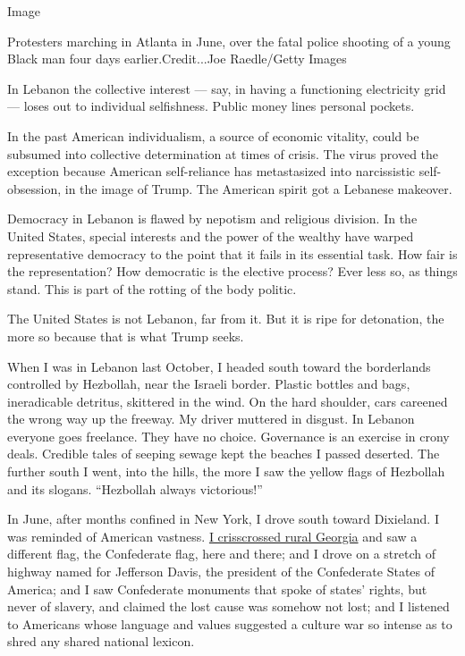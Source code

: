 Image

Protesters marching in Atlanta in June, over the fatal police shooting
of a young Black man four days earlier.Credit...Joe Raedle/Getty Images

In Lebanon the collective interest --- say, in having a functioning
electricity grid --- loses out to individual selfishness. Public money
lines personal pockets.

In the past American individualism, a source of economic vitality, could
be subsumed into collective determination at times of crisis. The virus
proved the exception because American self-reliance has metastasized
into narcissistic self-obsession, in the image of Trump. The American
spirit got a Lebanese makeover.

Democracy in Lebanon is flawed by nepotism and religious division. In
the United States, special interests and the power of the wealthy have
warped representative democracy to the point that it fails in its
essential task. How fair is the representation? How democratic is the
elective process? Ever less so, as things stand. This is part of the
rotting of the body politic.

The United States is not Lebanon, far from it. But it is ripe for
detonation, the more so because that is what Trump seeks.

When I was in Lebanon last October, I headed south toward the
borderlands controlled by Hezbollah, near the Israeli border. Plastic
bottles and bags, ineradicable detritus, skittered in the wind. On the
hard shoulder, cars careened the wrong way up the freeway. My driver
muttered in disgust. In Lebanon everyone goes freelance. They have no
choice. Governance is an exercise in crony deals. Credible tales of
seeping sewage kept the beaches I passed deserted. The further south I
went, into the hills, the more I saw the yellow flags of Hezbollah and
its slogans. ``Hezbollah always victorious!''

In June, after months confined in New York, I drove south toward
Dixieland. I was reminded of American vastness.
\href{https://www.nytimes.com/2020/06/26/opinion/let-freedom-ring-from-georgia.html}{I
crisscrossed rural Georgia} and saw a different flag, the Confederate
flag, here and there; and I drove on a stretch of highway named for
Jefferson Davis, the president of the Confederate States of America; and
I saw Confederate monuments that spoke of states' rights, but never of
slavery, and claimed the lost cause was somehow not lost; and I listened
to Americans whose language and values suggested a culture war so
intense as to shred any shared national lexicon.

